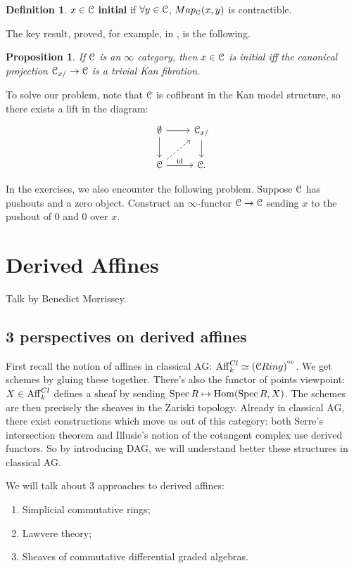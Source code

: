 \documentclass[10pt,a4paper,reqno,oneside]{book} %
\theoremstyle{plain}
\newtheorem{prop}[thm]{Proposition}
\theoremstyle{definition}
\newtheorem{defin}[thm]{Definition}
\theoremstyle{remark}
\numberwithin{equation}{section}
\begin{document}
\begin{defin}
$x \in \mathcal C$ \textbf{initial} if $\forall y \in \mathcal C$, $Map_{\mathcal C}(x,y)$ is contractible.
\end{defin}

The key result, proved, for example, in \cite{Groth}, is the following.
\begin{prop}
If $\mathcal C$ is an $\infty$ category, then $x \in \mathcal C$ is initial iff the canonical projection $\mathcal C_{x/} \to \mathcal C$ is
a trivial Kan fibration.
\end{prop}

To solve our problem, note that $\mathcal C$ is cofibrant in the Kan model structure, so there exists a lift in the diagram:
\[
\begin{tikzcd}
\emptyset\arrow{d}\arrow{r} & \cC_{x/}\arrow{d} \\
\cC \arrow{r}{\id}\arrow[dashed]{ur} & \cC .
\end{tikzcd}
\]

In the exercises, we also encounter the following problem. Suppose $\mathcal C$ has pushouts and a zero object. Construct 
an $\infty$-functor $\mathcal C \to \mathcal C$ sending $x$ to the pushout of 0 and 0 over $x$. 






\chapter{Derived Affines}
Talk by Benedict Morrissey.

\section{3 perspectives on derived affines}

First recall the notion of affines in classical AG: $\mathrm{Aff}_k^{Cl} \simeq (\mathcal C Ring)^{^\mathrm{op}}$. We get schemes by gluing these together.
There's also the functor of points viewpoint: $X \in \mathrm{Aff}_k^{Cl}$ defines a sheaf by sending $\operatorname{Spec} R \mapsto \operatorname{Hom}
(\operatorname{Spec} R, X)$. The schemes are then precisely the sheaves in the Zariski topology. Already in classical AG, there exist 
constructions which move us out of this category: 
both Serre's intersection theorem and Illusie's notion of the cotangent complex use derived functors.
So by introducing DAG, we will understand better these structures in classical AG.

We will talk about 3 approaches to derived affines:
\begin{enumerate}
\item \label{item:scr} Simplicial commutative rings;
\item \label{item:lawvere} Lawvere theory;
\item \label{item:cdga} Sheaves of commutative differential graded algebras.
\end{enumerate}
\end{document}

